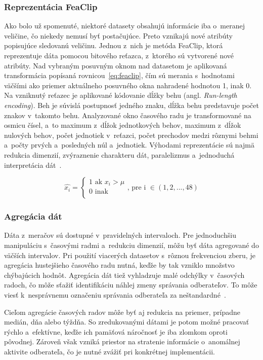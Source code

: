 \documentclass[a4paper,twoside,slovak,12pt,appendix]{article}
\begin{document}
\subsubsection{Reprezentácia FeaClip}
Ako bolo už spomenuté, niektoré datasety obsahujú informácie iba o~meranej
veličine, čo niekedy nemusí byť postačujúce. Preto vznikajú nové atribúty
popisujúce sledovanú veličinu. Jednou z~nich je metóda FeaClip, ktorá
reprezentuje dáta pomocou bitového reťazca, z~ktorého sú vytvorené nové
atribúty. Nad vybraným posuvným oknom nad datasetom je aplikovaná transformácia
popísaná rovnicou~\ref{eq:feaclip}, čím sú merania s~hodnotami väčšími ako
priemer aktuálneho posuvného okna nahradené hodnotou 1, inak 0. Na vzniknutý
reťazec je aplikované kódovanie dĺžky behu (angl. \textit{Run-length
encoding}). Beh je súvislá postupnosť jedného znaku, dĺžka behu predstavuje
počet znakov v~takomto behu. Analyzované okno časového radu je transformované
na osmicu čísel, a~to maximum z~dĺžok jednotkových behov, maximum z~dĺžok
nulových behov, počet jednotiek v~reťazci, počet prechodov medzi rôznymi behmi
a~počty prvých a~posledných núl a~jednotiek. Výhodami reprezentácie sú najmä
redukcia dimenzií, zvýraznenie charakteru dát, paralelizmus a~jednoduchá
interpretácia dát~\cite{Laurinec2018}.

\begin{equation}
  \label{eq:feaclip}
  \hat{x_i} =
  \begin{cases}
    1 \text{ ak } x_i > \mu \\
    0 \text{ inak } \\
  \end{cases}
  \text{, pre i } \in (1, 2, ..., 48)
\end{equation}

\subsubsection{Agregácia dát}
Dáta z~meračov sú dostupné v~pravidelných intervaloch. Pre jednoduchšiu
manipuláciu s~časovými radmi a~redukciu dimenzií, môžu byť dáta agregované do
väčších intervalov. Pri použití viacerých datasetov s~rôznou frekvenciou zberu,
je agregácia hustejšieho časového radu nutná, keďže by tak vzniklo množstvo
chýbajúcich hodnôt. Agregácia dát tiež vyhladzuje malé odchýlky v~časových
radoch, čo môže sťažiť identifikáciu náhlej zmeny správania odberateľov. To môže
viesť k~nesprávnemu označeniu správania odberateľa za
neštandardné~\cite{Cody2015}.

Cieľom agregácie časových radov môže byť aj redukcia na priemer, prípadne
medián, dňa alebo týždňa. So zredukovanými dátami je potom možné pracovať rýchlo
a~efektívne, keďže ich pamäťová náročnosť je iba zlomkom oproti pôvodnej.
Zároveň však vzniká priestor na stratenie informácie o~anomálnej aktivite
odberateľa, čo je nutné zvážiť pri konkrétnej implementácii.
\end{document}
